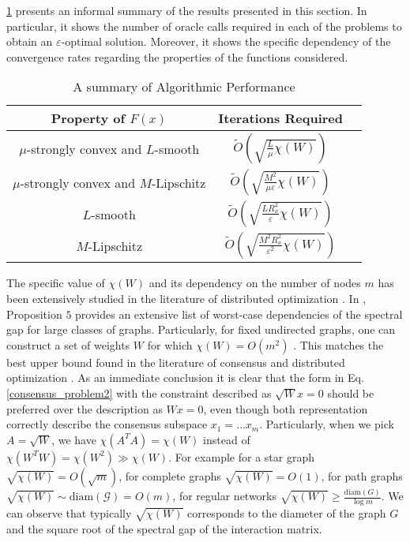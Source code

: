 \documentclass[final]{siamart1116}
\numberwithin{theorem}{section}
\begin{document}
	\cref{tab:summary} presents an informal summary of the results presented in this section. In particular, it shows the number of oracle calls required in each of the problems to obtain an $\varepsilon$-optimal solution. Moreover, it shows the specific dependency of the convergence rates regarding the properties of the functions considered. 
	\begin{table}[H]
		\centering
		\begin{tabular}{|c|c|c|} \hline
			\bf Property of $F(x)$ & \bf Iterations Required  \\ \hline
			$\mu$-strongly convex and $L$-smooth & $\tilde{O}\left( \sqrt{\frac{L}{\mu} \chi(W)} \right)$          \\ 
			$\mu$-strongly convex and $M$-Lipschitz&$\tilde{O}\left( \sqrt{\frac{M^2}{\mu \varepsilon} \chi(W)}\right) $ \\
			$L$-smooth &   $\tilde{O}\left( \sqrt{\frac{L R^2_x}{\varepsilon} \chi(W)}\right) $ \\
			$M$-Lipschitz& $\tilde{O}\left( \sqrt{\frac{M^2R_x^2}{\varepsilon^2} \chi(W)}\right) $\\ \hline
		\end{tabular}
		\caption{A summary of Algorithmic Performance}
		\label{tab:summary}    
	\end{table}
	
	The specific value of $\chi(W)$ and its dependency on the number of nodes $m$ has been extensively studied in the literature of distributed optimization \cite{ned15}. In \cite{ned17b}, Proposition $5$ provides an extensive list of worst-case dependencies of the spectral gap for large classes of graphs. Particularly, for fixed undirected graphs, one can construct a set of weights $W$ for which $\chi(W) = O(m^2)$ \cite{ols14}. This matches the best upper bound found in the literature of consensus and distributed optimization \cite{ore10,liu13,ols14}. As an immediate conclusion it is clear that the form in Eq.\eqref{consensus_problem2} with the constraint described as \mbox{$\sqrt{W}x=0$} should be preferred over the description as $Wx=0$, even though both representation correctly describe the consensus subspace $x_1 = \hdots x_m$. Particularly, when we pick $A = \sqrt{W}$, we have \mbox{$\chi(A^TA) = \chi(W)$} instead of \mbox{$\chi(W^TW) = \chi(W^2) \gg \chi(W)$}. For example for a star graph \mbox{$\sqrt{\chi(W)} =  O( \sqrt{m})$}, for complete graphs $\sqrt{\chi(W)} = O(1)$, for path graphs \mbox{$\sqrt{\chi(W)} \sim \text{diam}(\mathcal{G}) = O( m)$}, for regular networks $\sqrt{\chi(W)} \geq \frac{\text{diam}(G)}{\log m}$. We can observe that typically $\sqrt{\chi(W)} $ corresponds to the diameter of the graph $G$ and the square root of the spectral gap of the interaction matrix. 
	
\end{document}
